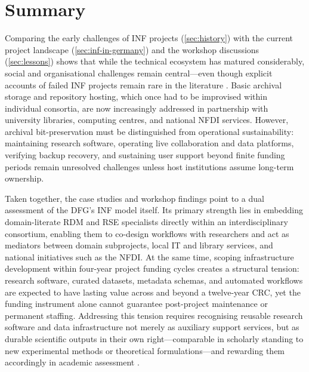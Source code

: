 \documentclass{eceasst}
\begin{document}
\section{Summary}
Comparing the early challenges of INF projects (\autoref{sec:history}) with the current project landscape (\autoref{sec:inf-in-germany}) and the workshop discussions (\autoref{sec:lessons}) shows that while the technical ecosystem has matured considerably, social and organisational challenges remain central---even though explicit accounts of failed INF projects remain rare in the literature \cite{Dierkes2020}.
Basic archival storage and repository hosting, which once had to be improvised within individual consortia, are now increasingly addressed in partnership with university libraries, computing centres, and national NFDI services.
However, archival bit-preservation must be distinguished from operational sustainability: maintaining research software, operating live collaboration and data platforms, verifying backup recovery, and sustaining user support beyond finite funding periods remain unresolved challenges unless host institutions assume long-term ownership.

Taken together, the case studies and workshop findings point to a dual assessment of the DFG's INF model itself.
Its primary strength lies in embedding domain-literate RDM and RSE specialists directly within an interdisciplinary consortium, enabling them to co-design workflows with researchers and act as mediators between domain subprojects, local IT and library services, and national initiatives such as the NFDI.
At the same time, scoping infrastructure development within four-year project funding cycles creates a structural tension: research software, curated datasets, metadata schemas, and automated workflows are expected to have lasting value across and beyond a twelve-year CRC, yet the funding instrument alone cannot guarantee post-project maintenance or permanent staffing.
Addressing this tension requires recognising reusable research software and data infrastructure not merely as auxiliary support services, but as durable scientific outputs in their own right---comparable in scholarly standing to new experimental methods or theoretical formulations---and rewarding them accordingly in academic assessment \cite{Anzt:2020,Goth:2025, Goth2026}.
\end{document}
